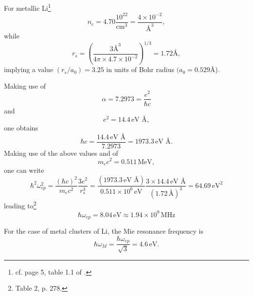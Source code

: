 \begin{subappendices}
For metallic Li\footnote{cf. page 5, table 1.1 of \cite{Ashcroft:87}.}
\begin{equation}
n_e=4.70\frac{10^{22}}{\text{cm}^3}=\frac{4\times10^{-2}}{\text{\AA{}}^3},
\end{equation}
while
\begin{equation}
r_s=\left(\frac{3\text{\AA}^3}{4\pi\times4.7\times10^{-2}}\right)^{1/3}=1.72\text{\AA},
\end{equation}
implying a value $(r_s/a_0)=3.25$ in units of  Bohr radius $(a_0=0.529$\AA).

Making use of 
\begin{equation}
\alpha=7.2973=\frac{e^2}{\hbar c}
\end{equation}
and
\begin{equation}
e^2=14.4\,\text{eV \AA},
\end{equation}
one obtains
\begin{equation}
\hbar c=\frac{14.4\,\text{eV \AA}}{7.2973}=1973.3\,\text{eV \AA}.
\end{equation}
Making use of the above values and of
\begin{equation}
m_ec^2=0.511\,\text{MeV},
\end{equation}
one can write
\begin{equation}
\hbar^2\omega^2_{ep}=\frac{(\hbar c)^2}{m_e c^2}\frac{3e^2}{r_s^3}=\frac{(1973.3\,\text{eV \AA})}{0.511\times10^6\,\text{eV}}\frac{3\times14.4\,\text{eV \AA}}{(1.72\,\text{\AA})^3}=64.69\,\text{eV}^2
\end{equation}
leading to\footnote{\cite{Kittel:96} Table 2, p. 278.}
\begin{equation}
\hbar\omega_{ep}=8.04\,\text{eV}\approx 1.94\times 10^9\,\text{MHz}
\end{equation}


For the case of metal clusters of Li, the Mie resonance frequency is
\begin{equation}
\hbar\omega_M=\frac{\hbar\omega_{ep}}{\sqrt{3}}=4.6\,\text{eV}.
\end{equation}

\end{subappendices}
